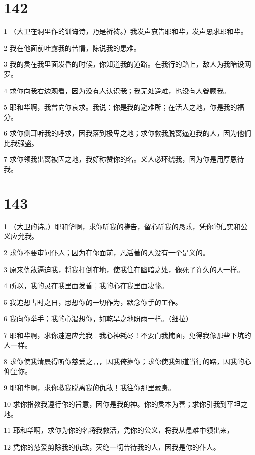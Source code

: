 \chapter{142}

\par 1 （大卫在洞里作的训诲诗，乃是祈祷。）我发声哀告耶和华，发声恳求耶和华。
\par 2 我在他面前吐露我的苦情，陈说我的患难。
\par 3 我的灵在我里面发昏的时候，你知道我的道路。在我行的路上，敌人为我暗设网罗。
\par 4 求你向我右边观看，因为没有人认识我；我无处避难，也没有人眷顾我。
\par 5 耶和华啊，我曾向你哀求。我说：你是我的避难所；在活人之地，你是我的福分。
\par 6 求你侧耳听我的呼求，因我落到极卑之地；求你救我脱离逼迫我的人，因为他们比我强盛。
\par 7 求你领我出离被囚之地，我好称赞你的名。义人必环绕我，因为你是用厚恩待我。

\chapter{143}

\par 1 （大卫的诗。）耶和华啊，求你听我的祷告，留心听我的恳求，凭你的信实和公义应允我。
\par 2 求你不要审问仆人；因为在你面前，凡活著的人没有一个是义的。
\par 3 原来仇敌逼迫我，将我打倒在地，使我住在幽暗之处，像死了许久的人一样。
\par 4 所以，我的灵在我里面发昏；我的心在我里面凄惨。
\par 5 我追想古时之日，思想你的一切作为，默念你手的工作。
\par 6 我向你举手；我的心渴想你，如乾旱之地盼雨一样。（细拉）
\par 7 耶和华啊，求你速速应允我！我心神耗尽！不要向我掩面，免得我像那些下坑的人一样。
\par 8 求你使我清晨得听你慈爱之言，因我倚靠你；求你使我知道当行的路，因我的心仰望你。
\par 9 耶和华啊，求你救我脱离我的仇敌！我往你那里藏身。
\par 10 求你指教我遵行你的旨意，因你是我的神。你的灵本为善；求你引我到平坦之地。
\par 11 耶和华啊，求你为你的名将我救活，凭你的公义，将我从患难中领出来，
\par 12 凭你的慈爱剪除我的仇敌，灭绝一切苦待我的人，因我是你的仆人。

